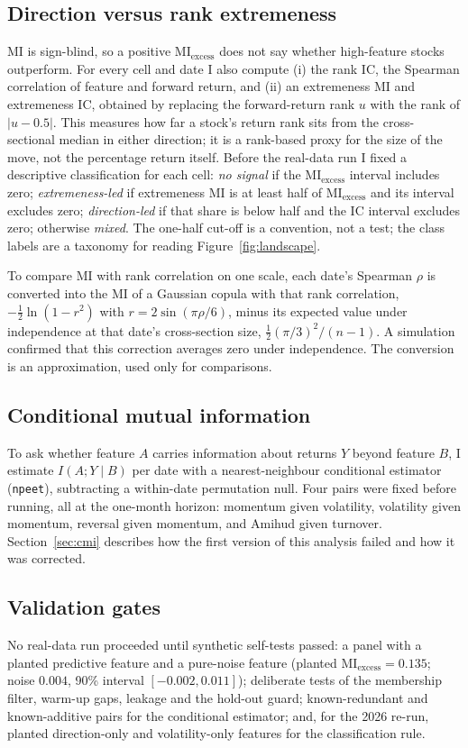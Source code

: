 \documentclass[11pt]{article}
\newcommand{\miex}{\mathrm{MI}_{\mathrm{excess}}}
\begin{document}
\subsection{Direction versus rank extremeness}
MI is sign-blind, so a positive $\miex$ does not say whether high-feature stocks
outperform. For every cell and date I also compute (i) the rank IC, the Spearman
correlation of feature and forward return, and (ii) an extremeness MI and
extremeness IC, obtained by replacing the forward-return rank $u$ with the rank of
$|u-0.5|$. This measures how far a stock's return rank sits from the cross-sectional
median in either direction; it is a rank-based proxy for the size of the move, not
the percentage return itself. Before the real-data run I fixed a descriptive
classification for each cell: \emph{no signal} if the $\miex$ interval includes zero;
\emph{extremeness-led} if extremeness MI is at least half of $\miex$ and its interval
excludes zero; \emph{direction-led} if that share is below half and the IC interval
excludes zero; otherwise \emph{mixed}. The one-half cut-off is a convention, not a
test; the class labels are a taxonomy for reading Figure~\ref{fig:landscape}.

To compare MI with rank correlation on one scale, each date's Spearman $\rho$ is
converted into the MI of a Gaussian copula with that rank correlation,
$-\tfrac12\ln(1-r^2)$ with $r = 2\sin(\pi\rho/6)$, minus its expected value under
independence at that date's cross-section size, $\tfrac12(\pi/3)^2/(n-1)$. A
simulation confirmed that this correction averages zero under independence. The
conversion is an approximation, used only for comparisons.

\subsection{Conditional mutual information}
To ask whether feature $A$ carries information about returns $Y$ beyond feature $B$,
I estimate $I(A;Y\mid B)$ per date with a nearest-neighbour conditional estimator
(\texttt{npeet}), subtracting a within-date permutation null. Four pairs were fixed
before running, all at the one-month horizon: momentum given volatility, volatility
given momentum, reversal given momentum, and Amihud given turnover.
Section~\ref{sec:cmi} describes how the first version of this analysis failed and how
it was corrected.

\subsection{Validation gates}
No real-data run proceeded until synthetic self-tests passed: a panel with a planted
predictive feature and a pure-noise feature (planted $\miex = 0.135$; noise $0.004$,
90\% interval $[-0.002, 0.011]$); deliberate tests of the membership filter, warm-up
gaps, leakage and the hold-out guard; known-redundant and known-additive pairs for the
conditional estimator; and, for the 2026 re-run, planted direction-only and
volatility-only features for the classification rule.
\end{document}
